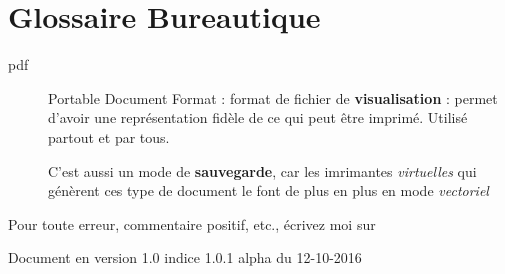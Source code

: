 \documentclass[a4paper,12pt,french]{sphinxmanual}
\begin{document}
\section{Glossaire Bureautique}
\label{burotic/glossaire_burotic:glossaire-burotic}\label{burotic/glossaire_burotic::doc}\label{burotic/glossaire_burotic:glossaire-bureautique}\begin{description}
\item[{pdf}] \leavevmode{}\label{burotic/glossaire_burotic:term-pdf}
Portable Document Format : format de fichier de \textbf{visualisation} : permet d'avoir une représentation fidèle de ce qui peut être imprimé. Utilisé partout et par tous.

C'est aussi un mode de \textbf{sauvegarde}, car les imrimantes \emph{virtuelles} qui génèrent ces type de document le font de plus en plus en mode \emph{vectoriel}

\end{description}

Pour toute erreur, commentaire positif, etc., écrivez moi sur 

Document en version 1.0 indice 1.0.1 alpha du 12-10-2016



\renewcommand{\indexname}{Index}
\printindex
\end{document}
